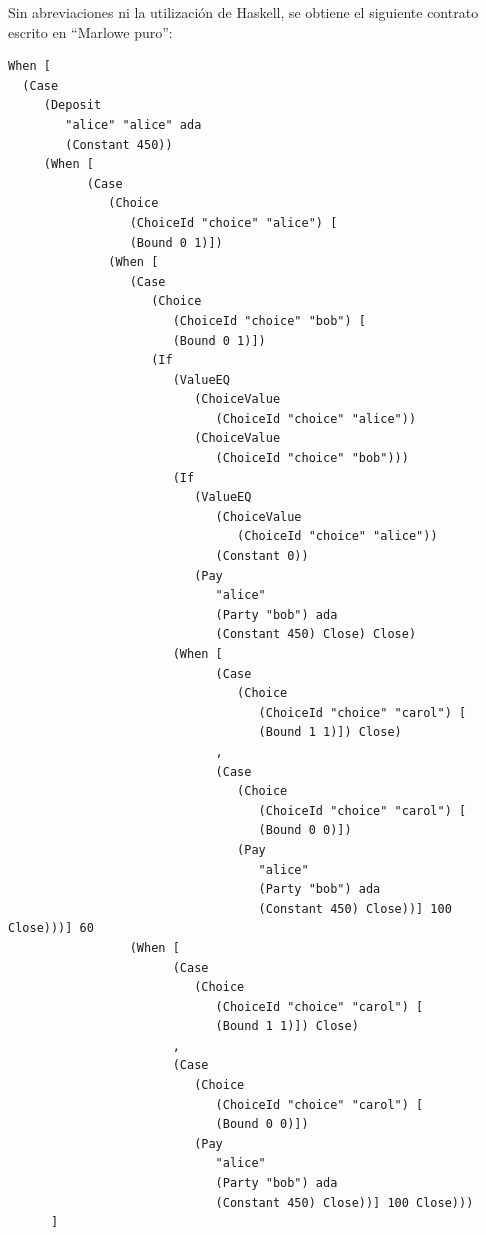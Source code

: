 \documentclass[12pt]{book}
\begin{document}
Sin abreviaciones ni la utilización de Haskell, se obtiene el siguiente contrato escrito en ``Marlowe puro'':

\begin{lstlisting}[style=Haskell-cardano, language=Marlowe, caption=Contrato \textit{Escrow} completamente expandido.]
When [
  (Case
     (Deposit
        "alice" "alice" ada
        (Constant 450))
     (When [
           (Case
              (Choice
                 (ChoiceId "choice" "alice") [
                 (Bound 0 1)])
              (When [
                 (Case
                    (Choice
                       (ChoiceId "choice" "bob") [
                       (Bound 0 1)])
                    (If
                       (ValueEQ
                          (ChoiceValue
                             (ChoiceId "choice" "alice"))
                          (ChoiceValue
                             (ChoiceId "choice" "bob")))
                       (If
                          (ValueEQ
                             (ChoiceValue
                                (ChoiceId "choice" "alice"))
                             (Constant 0))
                          (Pay
                             "alice"
                             (Party "bob") ada
                             (Constant 450) Close) Close)
                       (When [
                             (Case
                                (Choice
                                   (ChoiceId "choice" "carol") [
                                   (Bound 1 1)]) Close)
                             ,
                             (Case
                                (Choice
                                   (ChoiceId "choice" "carol") [
                                   (Bound 0 0)])
                                (Pay
                                   "alice"
                                   (Party "bob") ada
                                   (Constant 450) Close))] 100 Close)))] 60
                 (When [
                       (Case
                          (Choice
                             (ChoiceId "choice" "carol") [
                             (Bound 1 1)]) Close)
                       ,
                       (Case
                          (Choice
                             (ChoiceId "choice" "carol") [
                             (Bound 0 0)])
                          (Pay
                             "alice"
                             (Party "bob") ada
                             (Constant 450) Close))] 100 Close)))
      ]
\end{lstlisting}
\end{document}
